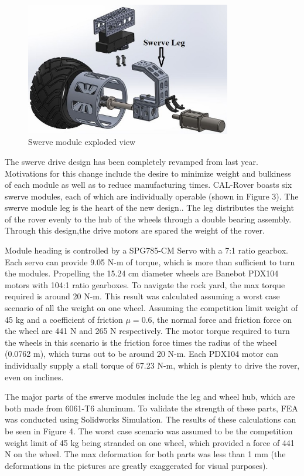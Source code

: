 \documentclass[titlepage,twocolumn,10pt]{article}
\begin{document}
    \begin{figure}[H]
        \centering
        \includegraphics*[width = 9cm]{images/swerveexp.jpg}
        \caption{Swerve module exploded view}
    \end{figure}
    The swerve drive design has been completely revamped from last year. Motivations for this change include the desire to minimize weight and bulkiness of each module as well as to reduce manufacturing times. CAL-Rover boasts six swerve modules, each of which are individually operable (shown in Figure 3). The swerve module leg is the heart of the new design.. The leg distributes the weight of the rover evenly to the hub of the wheels through a double bearing assembly. Through this design,the drive motors are spared the weight of the rover.

    Module heading is controlled by a SPG785-CM Servo with a 7:1 ratio gearbox. Each servo can provide 9.05 N-m of torque, which is more than sufficient to turn the modules. Propelling the 15.24 cm diameter wheels are Banebot PDX104 motors with 104:1 ratio gearboxes. To navigate the rock yard, the max torque required is around 20 N-m. This result was calculated assuming a worst case scenario of all the weight on one wheel. Assuming the competition limit weight of 45 kg and a coefficient of friction $\mu = 0.6$, the normal force and friction force on the wheel are 441 N and 265 N respectively. The motor torque required to turn the wheels in this scenario is the friction force times the radius of the wheel (0.0762 m), which turns out to be around 20 N-m. Each PDX104 motor can individually supply a stall torque of 67.23 N-m, which is plenty to drive the rover, even on inclines.

    The major parts of the swerve modules include the leg and wheel hub, which are both made from 6061-T6 aluminum. To validate the strength of these parts, FEA was conducted using Solidworks Simulation. The results of these calculations can be seen in Figure 4. The worst case scenario was assumed to be the competition weight limit of 45 kg being stranded on one wheel, which provided a force of 441 N on the wheel. The max deformation for both parts was less than 1 mm (the deformations in the pictures are greatly exaggerated for visual purposes).
\end{document}
